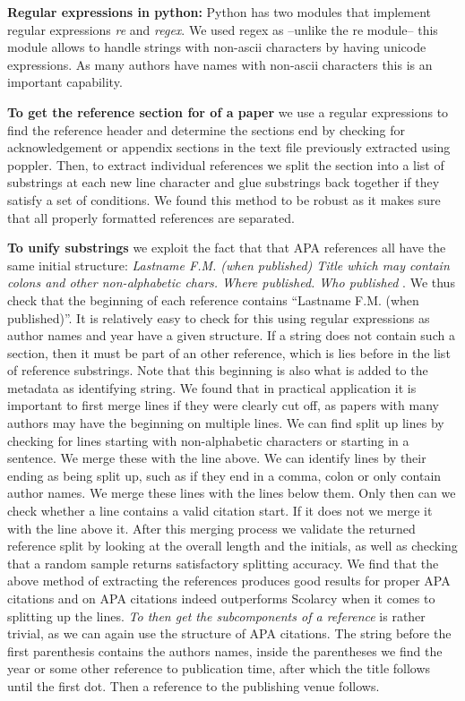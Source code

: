 \documentclass[article,twocolumn]{IEEEtran}
\begin{document}
\textbf{Regular expressions in python:} Python has two modules that
implement regular expressions \emph{re} and \emph{regex}. We used regex
as --unlike the re module-- this module allows to handle strings with
non-ascii characters by having unicode expressions. As many authors have
names with non-ascii characters this is an important capability.

\textbf{To get the reference section for of a paper} we use a regular
expressions to find the reference header and determine the sections end
by checking for acknowledgement or appendix sections in the text file
previously extracted using poppler. Then, to extract individual
references we split the section into a list of substrings at each new
line character and glue substrings back together if they satisfy a set
of conditions. We found this method to be robust as it makes sure that
all properly formatted references are separated.

\textbf{To unify substrings} we exploit the fact that that APA
references all have the same initial structure: \emph{Lastname F.M.
(when published) Title which may contain colons and other non-alphabetic
chars. Where published. Who published} \cite{apaformat}. We thus check
that the beginning of each reference contains ``Lastname F.M. (when
published)''. It is relatively easy to check for this using regular
expressions as author names and year have a given structure. If a string
does not contain such a section, then it must be part of an other
reference, which is lies before in the list of reference substrings.
Note that this beginning is also what is added to the metadata as
identifying string. We found that in practical application it is
important to first merge lines if they were clearly cut off, as papers
with many authors may have the beginning on multiple lines. We can find
split up lines by checking for lines starting with non-alphabetic
characters or starting in a sentence. We merge these with the line
above. We can identify lines by their ending as being split up, such as
if they end in a comma, colon or only contain author names. We merge
these lines with the lines below them. Only then can we check whether a
line contains a valid citation start. If it does not we merge it with
the line above it. After this merging process we validate the returned
reference split by looking at the overall length and the initials, as
well as checking that a random sample returns satisfactory splitting
accuracy. We find that the above method of extracting the references
produces good results for proper APA citations and on APA citations
indeed outperforms Scolarcy when it comes to splitting up the lines.
\emph{To then get the subcomponents of a reference} is rather trivial,
as we can again use the structure of APA citations. The string before
the first parenthesis contains the authors names, inside the parentheses
we find the year or some other reference to publication time, after
which the title follows until the first dot. Then a reference to the
publishing venue follows.
\end{document}
